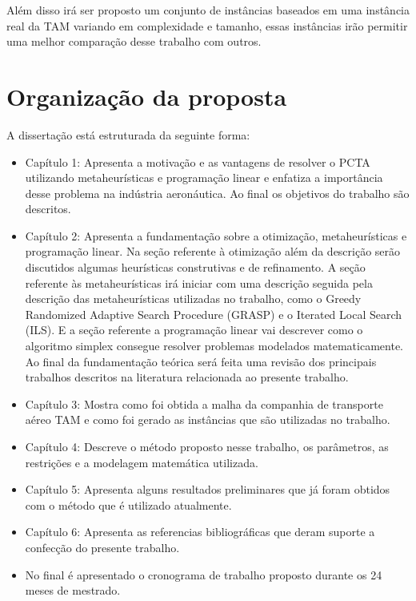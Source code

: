 Além disso irá ser proposto um conjunto de instâncias baseados em uma instância real da TAM variando em complexidade e tamanho, essas instâncias irão permitir uma melhor comparação desse trabalho com outros.

\section {Organização da proposta }

A dissertação está estruturada da seguinte forma:

\begin{itemize}

\item Capítulo 1: Apresenta a motivação e as vantagens de resolver o PCTA utilizando metaheurísticas e programação linear e enfatiza a importância desse problema na indústria aeronáutica.  Ao final os objetivos do trabalho são descritos.

\item Capítulo 2: Apresenta a fundamentação sobre a otimização, metaheurísticas e programação linear. Na seção referente à otimização além da descrição serão discutidos algumas heurísticas  construtivas e de refinamento. A seção referente às metaheurísticas irá iniciar com uma descrição seguida pela descrição das metaheurísticas utilizadas no trabalho, como o Greedy Randomized Adaptive Search Procedure (GRASP) e o Iterated Local Search (ILS). E a seção referente a programação linear vai descrever como o algoritmo simplex consegue resolver problemas modelados matematicamente. Ao final da fundamentação teórica será feita uma revisão dos principais trabalhos descritos na literatura relacionada ao presente trabalho.

\item Capítulo 3: Mostra como foi obtida a malha da companhia de transporte aéreo TAM e como foi gerado as instâncias que são utilizadas no trabalho.

\item Capítulo 4: Descreve o método proposto nesse trabalho, os parâmetros, as restrições e a modelagem matemática utilizada.

\item Capítulo 5: Apresenta alguns resultados preliminares que já foram obtidos com o método que é utilizado atualmente.

\item Capítulo 6: Apresenta as referencias bibliográficas que deram suporte a confecção do presente trabalho.

\item No final é apresentado o cronograma de trabalho proposto durante os 24 meses de mestrado. 
\end{itemize}